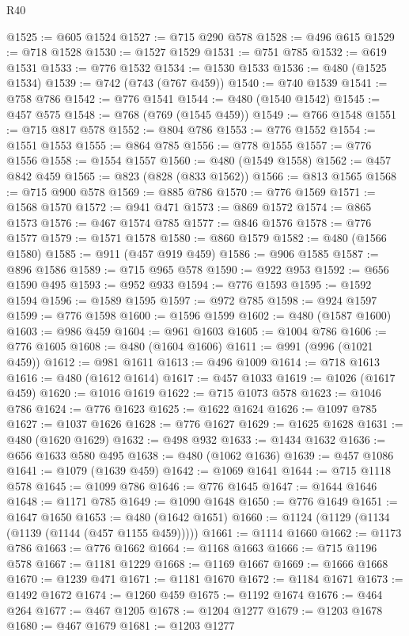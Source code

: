 \begin{lexlean}{R40}
\begin{coremodule}
@1525 := @605 @1524
@1527 := @715 @290 @578
@1528 := @496 @615
@1529 := @718 @1528
@1530 := @1527 @1529
@1531 := @751 @785
@1532 := @619 @1531
@1533 := @776 @1532
@1534 := @1530 @1533
@1536 := @480 (@1525 @1534)
@1539 := @742 (@743 (@767 @459))
@1540 := @740 @1539
@1541 := @758 @786
@1542 := @776 @1541
@1544 := @480 (@1540 @1542)
@1545 := @457 @575
@1548 := @768 (@769 (@1545 @459))
@1549 := @766 @1548
@1551 := @715 @817 @578
@1552 := @804 @786
@1553 := @776 @1552
@1554 := @1551 @1553
@1555 := @864 @785
@1556 := @778 @1555
@1557 := @776 @1556
@1558 := @1554 @1557
@1560 := @480 (@1549 @1558)
@1562 := @457 @842 @459
@1565 := @823 (@828 (@833 @1562))
@1566 := @813 @1565
@1568 := @715 @900 @578
@1569 := @885 @786
@1570 := @776 @1569
@1571 := @1568 @1570
@1572 := @941 @471
@1573 := @869 @1572
@1574 := @865 @1573
@1576 := @467 @1574 @785
@1577 := @846 @1576
@1578 := @776 @1577
@1579 := @1571 @1578
@1580 := @860 @1579
@1582 := @480 (@1566 @1580)
@1585 := @911 (@457 @919 @459)
@1586 := @906 @1585
@1587 := @896 @1586
@1589 := @715 @965 @578
@1590 := @922 @953
@1592 := @656 @1590 @495
@1593 := @952 @933
@1594 := @776 @1593
@1595 := @1592 @1594
@1596 := @1589 @1595
@1597 := @972 @785
@1598 := @924 @1597
@1599 := @776 @1598
@1600 := @1596 @1599
@1602 := @480 (@1587 @1600)
@1603 := @986 @459
@1604 := @961 @1603
@1605 := @1004 @786
@1606 := @776 @1605
@1608 := @480 (@1604 @1606)
@1611 := @991 (@996 (@1021 @459))
@1612 := @981 @1611
@1613 := @496 @1009
@1614 := @718 @1613
@1616 := @480 (@1612 @1614)
@1617 := @457 @1033
@1619 := @1026 (@1617 @459)
@1620 := @1016 @1619
@1622 := @715 @1073 @578
@1623 := @1046 @786
@1624 := @776 @1623
@1625 := @1622 @1624
@1626 := @1097 @785
@1627 := @1037 @1626
@1628 := @776 @1627
@1629 := @1625 @1628
@1631 := @480 (@1620 @1629)
@1632 := @498 @932
@1633 := @1434 @1632
@1636 := @656 @1633 @580 @495
@1638 := @480 (@1062 @1636)
@1639 := @457 @1086
@1641 := @1079 (@1639 @459)
@1642 := @1069 @1641
@1644 := @715 @1118 @578
@1645 := @1099 @786
@1646 := @776 @1645
@1647 := @1644 @1646
@1648 := @1171 @785
@1649 := @1090 @1648
@1650 := @776 @1649
@1651 := @1647 @1650
@1653 := @480 (@1642 @1651)
@1660 := @1124 (@1129 (@1134 (@1139 (@1144 (@457 @1155 @459)))))
@1661 := @1114 @1660
@1662 := @1173 @786
@1663 := @776 @1662
@1664 := @1168 @1663
@1666 := @715 @1196 @578
@1667 := @1181 @1229
@1668 := @1169 @1667
@1669 := @1666 @1668
@1670 := @1239 @471
@1671 := @1181 @1670
@1672 := @1184 @1671
@1673 := @1492 @1672
@1674 := @1260 @459
@1675 := @1192 @1674
@1676 := @464 @264
@1677 := @467 @1205
@1678 := @1204 @1277
@1679 := @1203 @1678
@1680 := @467 @1679
@1681 := @1203 @1277

\end{coremodule}
\end{lexlean}
